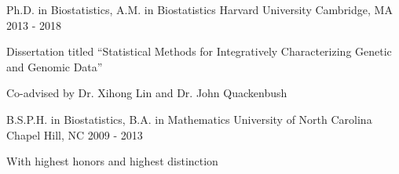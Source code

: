 

\begin{cventries}

  \cventry
    {Ph.D. in Biostatistics, A.M. in Biostatistics} %
    {Harvard University} %
    {Cambridge, MA} %
    {2013 - 2018} %
    {
      \begin{cvitems} %
        \item {Dissertation titled ``Statistical Methods for Integratively Characterizing Genetic and Genomic Data''}
        \item {Co-advised by Dr. Xihong Lin and Dr. John Quackenbush}
      \end{cvitems}
    }
    
    \cventry
    {B.S.P.H. in Biostatistics, B.A. in Mathematics} %
    {University of North Carolina} %
    {Chapel Hill, NC} %
    {2009 - 2013} %
    {
      \begin{cvitems} %
        \item {With highest honors and highest distinction}
      \end{cvitems}
    }
\end{cventries}
